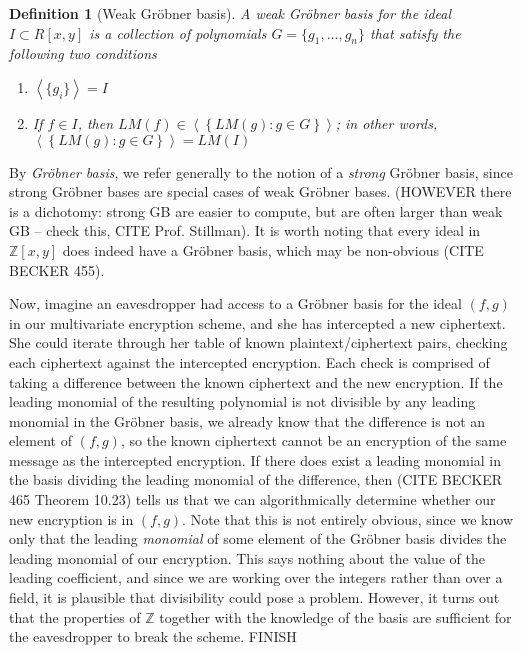 \documentclass[11pt]{report}
\newtheorem{definition}{Definition}
\newcommand{\Z}{\mathbb{Z}}
\newcommand{\Zxy}{\mathbb{Z}[x,y]}
\begin{document}
\begin{definition}[Weak Gr\"obner basis]
A \emph{weak Gr\"obner basis} for the ideal $I\subset R[x,y]$ is a collection of polynomials $G=\{g_1,\dots,g_n\}$ that satisfy the following two conditions
\begin{enumerate}
\item $\left\langle\{g_i\}\right\rangle = I$
\item If $f\in I$, then $LM(f) \in \left\langle \left\{ LM(g) : g\in G\right\} \right\rangle$; in other words, $\left\langle \left\{ LM(g) : g\in G\right\} \right\rangle = LM(I)$
\end{enumerate}
\end{definition}

By \emph{Gr\"obner basis}, we refer generally to the notion of a \emph{strong} Gr\"obner basis, since strong Gr\"obner bases are special cases of weak Gr\"obner bases. (HOWEVER there is a dichotomy: strong GB are easier to compute, but are often larger than weak GB -- check this, CITE Prof. Stillman). It is worth noting that every ideal in $\Zxy$ does indeed have a Gr\"obner basis, which may be non-obvious (CITE BECKER 455).

Now, imagine an eavesdropper had access to a Gr\"obner basis for the ideal $(f,g)$ in our multivariate encryption scheme, and she has intercepted a new ciphertext. She could iterate through her table of known plaintext/ciphertext pairs, checking each ciphertext against the intercepted encryption. Each check is comprised of taking a difference between the known ciphertext and the new encryption. If the leading monomial of the resulting polynomial is not divisible by any leading monomial in the Gr\"obner basis, we already know that the difference is not an element of $(f,g)$, so the known ciphertext cannot be an encryption of the same message as the intercepted encryption. If there does exist a leading monomial in the basis dividing the leading monomial of the difference, then (CITE BECKER 465 Theorem 10.23) tells us that we can algorithmically determine whether our new encryption is in $(f,g)$. Note that this is not entirely obvious, since we know only that the leading \emph{monomial} of some element of the Gr\"obner basis divides the leading monomial of our encryption. This says nothing about the value of the leading coefficient, and since we are working over the integers rather than over a field, it is plausible that divisibility could pose a problem. However, it turns out that the properties of $\Z$ together with the knowledge of the basis are sufficient for the eavesdropper to break the scheme. FINISH
\end{document}
